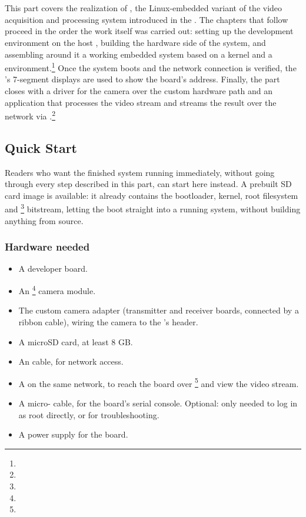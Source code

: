 \chapter{}
\label{chap:fpgalix-intro}

This part covers the realization of , the Linux-embedded variant of the video acquisition and processing system introduced in the . The chapters that follow proceed in the order the work itself was carried out: setting up the development environment on the host , building the hardware side of the system, and assembling around it a working embedded system based on a  kernel and a  environment.\footnote{} Once the system boots and the network connection is verified, the 's 7-segment displays are used to show the board's  address. Finally, the part closes with a driver for the camera over the custom hardware path and an application that processes the video stream and streams the result over the network via .\footnote{}

\section{Quick Start}
\label{sec:fpgalix-quick-start}

Readers who want the finished system running immediately, without going through every step described in this part, can start here instead. A prebuilt SD card image is available: it already contains the bootloader, kernel, root filesystem and \footnote{} bitstream, letting the  boot straight into a running system, without building anything from source.

\subsection{Hardware needed}

\begin{itemize}
    \item A  developer board.
    \item An \footnote{} camera module.
    \item The custom camera adapter (transmitter and receiver boards, connected by a ribbon cable), wiring the camera to the 's  header.
    \item A microSD card, at least 8 GB.
    \item An  cable, for network access.
    \item A  on the same network, to reach the board over \footnote{} and view the video stream.
    \item A micro- cable, for the board's serial console. Optional: only needed to log in as root directly, or for troubleshooting.
    \item A power supply for the board.
\end{itemize}

